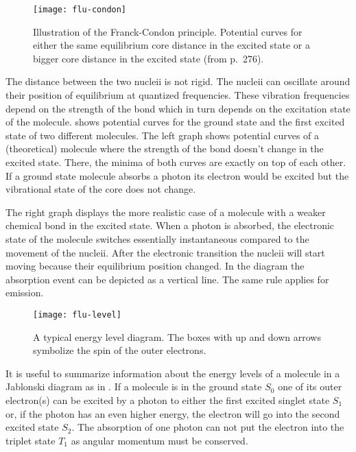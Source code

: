 \begin{figure}[!hbt]
  \centering
  \texttt{[image: flu-condon]}
  \caption{Illustration of the Franck-Condon principle. Potential
    curves for either the same equilibrium core distance in the
    excited state or a bigger core distance in the excited state (from
    \cite{Haken2006} p.~276).}
  \label{fig:flu-condon}
\end{figure}

The distance between the two nucleii is not rigid. The nucleii can
oscillate around their position of equilibrium at quantized
frequencies. These vibration frequencies depend on the strength of the
bond which in turn depends on the excitation state of the
molecule.  shows potential curves for the
ground state and the first excited state of two different
molecules. The left graph shows potential curves of a (theoretical)
molecule where the strength of the bond doesn't change in the excited
state. There, the minima of both curves are exactly on top of each
other. If a ground state molecule absorbs a photon its electron would
be excited but the vibrational state of the core does not change.

The right graph displays the more realistic case of a molecule with a
weaker chemical bond in the excited state. When a photon is absorbed,
the electronic state of the molecule switches essentially
instantaneous compared to the movement of the nucleii. After the
electronic transition the nucleii will start moving because their
equilibrium position changed. In the diagram the absorption event can
be depicted as a vertical line. The same rule applies for emission.

\begin{figure}[!hbt]
  \centering
  \texttt{[image: flu-level]}
  \caption{A typical energy level diagram. The boxes with up and down arrows symbolize the spin of the outer electrons.}
  \label{fig:flu-level}
\end{figure}

It is useful to summarize information about the energy levels of a
molecule in a Jablonski diagram as in . If a
molecule is in the ground state $S_0$ one of its outer electron(s) can
be excited by a photon to either the first excited singlet state $S_1$
or, if the photon has an even higher energy, the electron will go into
the second excited state $S_2$.  The absorption of one photon can not
put the electron into the triplet state $T_1$ as angular momentum must
be conserved.

